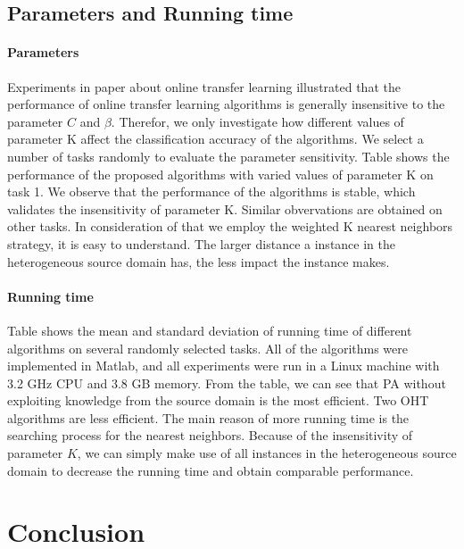 \documentclass[letterpaper]{article}
\begin{document}
\subsection{Parameters and Running time}
\paragraph{Parameters}
Experiments in paper about online transfer learning illustrated that the performance of online transfer learning algorithms is generally insensitive to the parameter $C$ and $\beta$.
Therefor, we only investigate how different values of parameter K affect the classification accuracy of the algorithms.
We select a number of tasks randomly to evaluate the parameter sensitivity.
Table shows the performance of the proposed algorithms with varied values of parameter K on task 1.
We observe that the performance of the algorithms is stable, which validates the insensitivity of parameter K.
Similar obvervations are obtained on other tasks.
In consideration of that we employ the weighted K nearest neighbors strategy, it is easy to understand.
The larger distance a instance in the heterogeneous source domain has, the less impact the instance makes.

\paragraph{Running time}
Table shows the mean and standard deviation of running time of different algorithms on several randomly selected tasks.
All of the algorithms were implemented in Matlab, and all experiments were run in a Linux machine with 3.2 GHz CPU and 3.8 GB memory.
From the table, we can see that PA without exploiting knowledge from the source domain is the most efficient.
Two OHT algorithms are less efficient.
The main reason of more running time is the searching process for the nearest neighbors.
Because of the insensitivity of parameter $K$, we can simply make use of all instances in the heterogeneous source domain to decrease the running time and obtain comparable performance.

\section{Conclusion}
\end{document}
